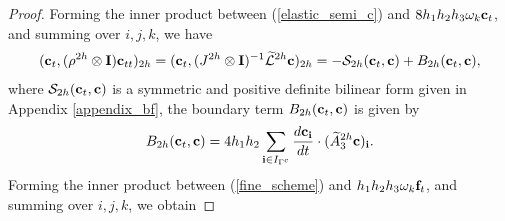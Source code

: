 \begin{proof}
		Forming the inner product between (\ref{elastic_semi_c}) and $8h_1h_2h_3\omega_k{\bf c}_t$, and summing over $i,j,k$, we have
	\begin{eqnarray}\label{coarse_simple}
	({\bf c}_t, (\rho^{2h}\otimes {\bf I}){\bf c}_{tt})_{2h} = ({\bf c}_t,(J^{2h}\otimes {\bf I})^{-1}\wt{\mathcal{L}}^{2h}{\bf c})_{2h} = -\mathcal{S}_{2h}({\bf c}_t,{\bf c}) + B_{2h}({\bf c}_t,{{\bf c}}),
	\end{eqnarray}
	where $\mathcal{S}_{2h}({\bf c}_t,{\bf c})$ is a symmetric and positive definite bilinear form given in Appendix \ref{appendix_bf}, the boundary term $B_{2h} ({\bf c}_t,{\bf c})$ is given by
	\begin{equation}\label{bounary_c1}
	B_{2h} ({\bf c}_t,{\bf c}) = 4h_1h_2\sum_{{\bf i}\in I_{\Gamma^c}}\frac{d{\bf c}_{\bf i}}{dt}\cdot (\wt{A}_3^{2h}{\bf c})_{\bf i}.
	\end{equation}
	Forming the inner product between (\ref{fine_scheme}) and $h_1h_2h_3\omega_k{\bf f}_t$, and summing over $i,j,k$, we obtain

\end{proof}
